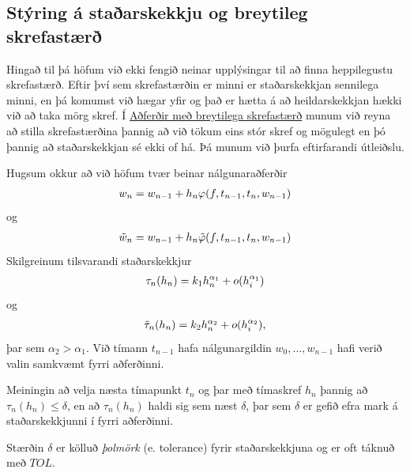 \documentclass[letterpaper,10pt,icelandic]{sphinxmanual}
\begin{document}
\subsection{Stýring á staðarskekkju og breytileg skrefastærð}
\label{kafli06:styring-a-staarskekkju-og-breytileg-skrefastaer}
Hingað til þá höfum við ekki fengið neinar upplýsingar til að finna heppilegustu skrefastærð.
Eftir því sem skrefastærðin er minni er staðarskekkjan sennilega minni, en þá komumst við
hægar yfir og það er hætta á að heildarskekkjan hækki við að taka mörg skref.
Í {\hyperref[kafli06:aferir-me-breytilega-skrefastaer]{Aðferðir með breytilega skrefastærð}} munum við reyna að stilla
skrefastærðina þannig að við tökum eins stór skref og mögulegt en þó
þannig að staðarskekkjan sé ekki of há.
Þá munum við þurfa eftirfarandi útleiðslu.

Hugsum okkur að við höfum tvær beinar nálgunaraðferðir
\begin{gather}
\begin{split}w_{n} = w_{n-1} + h_n\varphi(f,t_{n-1},t_n,w_{n-1})\end{split}\notag
\end{gather}
og
\begin{gather}
\begin{split}\tilde w_{n} = w_{n-1} + h_n\tilde\varphi(f,t_{n-1},t_n,w_{n-1})\end{split}\notag
\end{gather}
Skilgreinum tilsvarandi staðarskekkjur
\begin{gather}
\begin{split}\tau_n(h_n) = k_1h_n^{\alpha_1} + o(h_i^{\alpha_1})\end{split}\notag
\end{gather}
og
\begin{gather}
\begin{split}\tilde\tau_n(h_n) = k_2h_n^{\alpha_2} + o(h_i^{\alpha_2}),\end{split}\notag
\end{gather}
þar sem \(\alpha_2>\alpha_1\). Við tímann \(t_{n-1}\) hafa
nálgunargildin \(w_0,\ldots,w_{n-1}\) hafi verið valin samkvæmt
fyrri aðferðinni.

Meiningin að velja næsta tímapunkt \(t_n\) og þar með tímaskref
\(h_n\) þannig að \(\tau_n(h_n)\leq \delta\), en að
\(\tau_n(h_n)\) haldi sig sem næst \(\delta\), þar sem
\(\delta\) er gefið efra mark á staðarskekkjunni í fyrri
aðferðinni.

Stærðin \(\delta\) er kölluð \emph{þolmörk} (e. tolerance) fyrir
staðarskekkjuna og er oft táknuð með \(TOL\).
\end{document}
